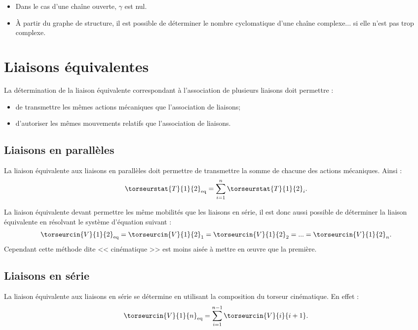 \begin{rem}
\begin{itemize}
\item Dans le cas d'une chaîne ouverte, $\gamma$ est nul. 
\item À partir du graphe de structure, il est possible de déterminer le nombre cyclomatique d'une chaîne complexe... si elle n'est pas trop complexe.
\end{itemize}
\end{rem}

\section{Liaisons équivalentes}
\begin{obj}
La détermination de la liaison équivalente correspondant à l'association de plusieurs liaisons doit permettre : 
\begin{itemize}
\item de transmettre les mêmes actions mécaniques que l'association de liaisons;
\item d'autoriser les mêmes mouvements relatifs que l'association de liaisons.
\end{itemize}
\end{obj}

\subsection{Liaisons en parallèles}
\begin{methode}
La liaison équivalente aux liaisons en parallèles doit permettre de transmettre la somme de chacune des actions mécaniques. Ainsi : 
$$
\torseurstat{T}{1}{2}_{\text{eq}} = \sum\limits_{i=1}^{n}\torseurstat{T}{1}{2}_{i}.
$$ 
\end{methode}

\begin{rem}
La liaison équivalente devant permettre les même mobilités que les liaisons en série, il est donc aussi possible de déterminer la liaison équivalente en résolvant le système d'équation suivant : 
$$
\torseurcin{V}{1}{2}_{\text{eq}} 
= \torseurcin{V}{1}{2}_1
= \torseurcin{V}{1}{2}_2
=...
= \torseurcin{V}{1}{2}_n.
$$ 
Cependant cette méthode dite << cinématique >> est moins aisée à mettre en \oe{}uvre que la première.

\end{rem}
\subsection{Liaisons en série}
\begin{methode}
La liaison équivalente aux liaisons en série se détermine en utilisant la composition du torseur cinématique. En effet : 
$$
\torseurcin{V}{1}{n}_{\text{eq}} = \sum\limits_{i=1}^{n-1}\torseurcin{V}{i}{i+1}.
$$ 
\end{methode}

